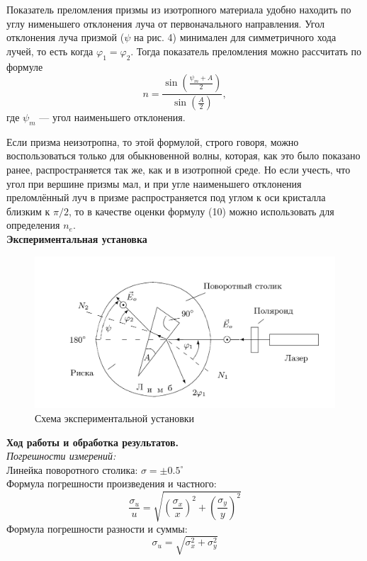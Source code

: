 \documentclass[a4paper, 12pt]{article}%
\begin{document}
	Показатель преломления призмы из изотропного материала удобно находить по углу нименьшего отклонения луча от первоначального направления. Угол отклонения луча призмой ($\psi$ на рис. 4) минимален для симметричного хода лучей, то есть когда $\varphi_1 = \varphi_2$. Тогда показатель преломления можно рассчитать по формуле
	\begin{equation}
		n=\frac{\sin \left(\frac{\psi_{m}+A}{2}\right)}{\sin \left(\frac{A}{2}\right)},
	\end{equation}
	где $\psi_m$ --- угол наименьшего отклонения.
	
	Если призма неизотропна, то этой формулой, строго говоря, можно воспользоваться только для обыкновенной волны, которая, как это было показано ранее, распространяется так же, как и в изотропной среде. Но если учесть, что угол при вершине призмы мал, и при угле наименьшего отклонения преломлённый луч в призме распространяется под углом к оси кристалла близким к $\pi / 2$, то в качестве оценки формулу (10) можно использовать для определения $n_e$.\\
	
	
		\textbf{Экспериментальная установка}\\ 
		
	\begin{figure}[H]
		\begin{center}
			\includegraphics[width = 0.6\linewidth]{ust.png}
			\caption{Схема экспериментальной установки}
		\end{center}
		
	\end{figure}	
	
	\textbf{Ход работы и обработка результатов.}\\
	
	\textit{Погрешности измерений:}\\
	Линейка поворотного столика: $\sigma = \pm 0.5^\circ$\\
	Формула погрешности произведения и частного:\\
	\begin{equation}
		\frac{\sigma_u}{u}=\sqrt{\left(\frac{\sigma_x}{x}\right)^2+\left(\frac{\sigma_y}{y}\right)^2}
	\end{equation}
	Формула погрешности разности и суммы:
	\begin{equation}
		\sigma_u=\sqrt{\sigma_x^2+\sigma_y^2}
	\end{equation}
	
\end{document}
